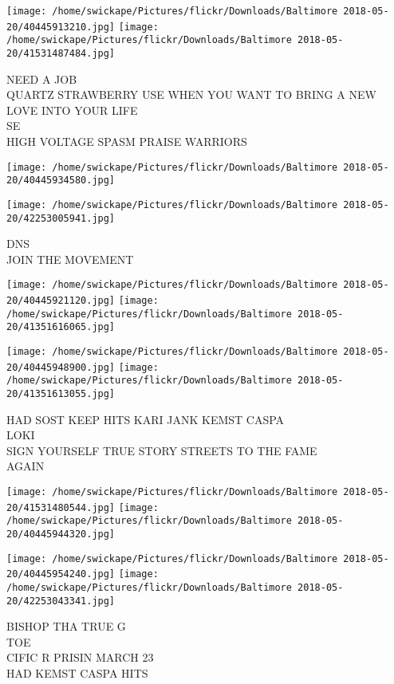 \documentclass[10pt,letterpaper]{article}
\begin{document}
\texttt{[image: /home/swickape/Pictures/flickr/Downloads/Baltimore 2018-05-20/40445913210.jpg]}
\texttt{[image: /home/swickape/Pictures/flickr/Downloads/Baltimore 2018-05-20/41531487484.jpg]}

NEED A JOB\\
QUARTZ STRAWBERRY USE WHEN YOU WANT TO BRING A NEW LOVE INTO YOUR LIFE\\
SE\\
HIGH VOLTAGE SPASM PRAISE WARRIORS\\
\pagebreak

\texttt{[image: /home/swickape/Pictures/flickr/Downloads/Baltimore 2018-05-20/40445934580.jpg]}

\vspace{0.25in}
\texttt{[image: /home/swickape/Pictures/flickr/Downloads/Baltimore 2018-05-20/42253005941.jpg]}

DNS\\
JOIN THE MOVEMENT\\
\pagebreak

\texttt{[image: /home/swickape/Pictures/flickr/Downloads/Baltimore 2018-05-20/40445921120.jpg]}
\texttt{[image: /home/swickape/Pictures/flickr/Downloads/Baltimore 2018-05-20/41351616065.jpg]}

\texttt{[image: /home/swickape/Pictures/flickr/Downloads/Baltimore 2018-05-20/40445948900.jpg]}
\texttt{[image: /home/swickape/Pictures/flickr/Downloads/Baltimore 2018-05-20/41351613055.jpg]}

HAD SOST KEEP HITS KARI JANK KEMST CASPA\\
LOKI\\
SIGN YOURSELF TRUE STORY STREETS TO THE FAME\\
AGAIN\\
\pagebreak

\texttt{[image: /home/swickape/Pictures/flickr/Downloads/Baltimore 2018-05-20/41531480544.jpg]}
\texttt{[image: /home/swickape/Pictures/flickr/Downloads/Baltimore 2018-05-20/40445944320.jpg]}

\texttt{[image: /home/swickape/Pictures/flickr/Downloads/Baltimore 2018-05-20/40445954240.jpg]}
\texttt{[image: /home/swickape/Pictures/flickr/Downloads/Baltimore 2018-05-20/42253043341.jpg]}

BISHOP THA TRUE G\\
TOE\\
CIFIC R PRISIN MARCH 23\\
HAD KEMST CASPA HITS\\
\pagebreak
\end{document}
